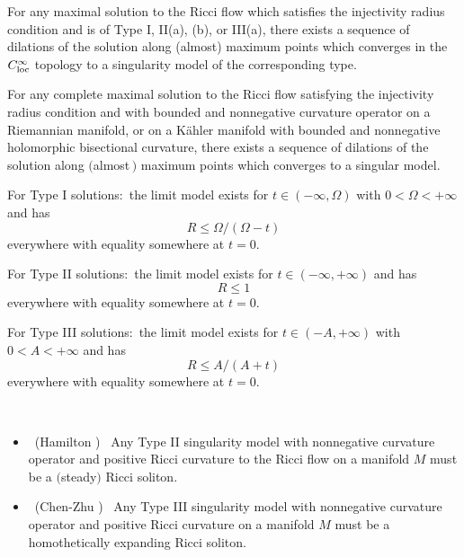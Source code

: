 \begin{theorem}
  \label{thm:cz-existence-of-dilation-limit-singularity-models}
For any maximal solution to the Ricci flow which satisfies the
injectivity radius condition and is of Type {\rm I, II(a), (b),}
or {\rm III(a),} there exists a sequence of dilations of the
solution along (almost) maximum points which converges in the
$C_{\rm loc}^{\infty}$ topology to a singularity model of the
corresponding type.
\end{theorem}
\begin{corollary}
  \label{cor:cz-restricted-singularity-model-types-under-nonnegative-curvature}
For any complete maximal solution to the Ricci flow satisfying the
injectivity radius condition and with bounded and nonnegative
curvature operator on a Riemannian manifold, or on a K\"ahler
manifold with bounded and nonnegative holomorphic bisectional
curvature, there exists a sequence of dilations of the solution
along $($almost$\,)$ maximum points which converges to a singular
model.

\vskip 0.1cm \noindent For Type {\rm I} solutions:\  the limit
model exists for $t\in (-\infty,\Omega)$ with $0<\Omega<+\infty$
and has
$$
R\leq \Omega/(\Omega-t)
$$
everywhere with equality somewhere at $t=0$.

\vskip 0.1cm \noindent For Type {\rm II} solutions:\ the limit
model exists for $t\in (-\infty, +\infty)$  and has
$$
R\leq 1
$$
everywhere with equality somewhere at $t=0$.

\vskip 0.1cm \noindent For Type {\rm III} solutions:\ the limit
model exists for $t\in(-A, +\infty)$ with $0<A<+\infty$ and has
$$
R\leq A/(A+t)
$$
everywhere with equality somewhere at $t=0$.
\end{corollary}
\begin{theorem}
  \label{thm:cz-type-ii-models-with-positive-ricci-curvature-are-steady-solitons}
\
\begin{itemize}
\item[(i)] \ {\rm (Hamilton \cite{Ha93E})} \ Any Type {\rm II}
singularity model with nonnegative curvature operator and positive
Ricci curvature to the Ricci flow on a manifold $M$ must be a
$($steady$)$ Ricci soliton. \item[(ii)] \ {\rm (Chen-Zhu
\cite{CZ00})} \ Any Type {\rm III} singularity model with
nonnegative curvature operator and positive Ricci curvature on a
manifold $M$ must be a homothetically expanding Ricci soliton.
\end{itemize}
\end{theorem}
